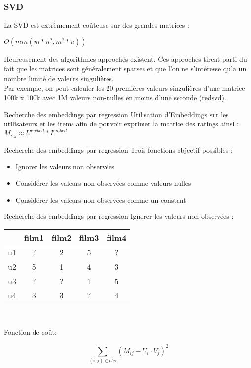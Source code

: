 \begin{frame}
  \frametitle{SVD}
  La SVD est extrèmement coûteuse sur des grandes matrices :
  \begin{center}
    $O(min(m*n^2,m^2*n))$
  \end{center}
  Heureusement des algorithmes approchés existent. Ces approches tirent parti du fait que les matrices sont généralement sparses et que l'on ne s'intéresse qu'a un nombre limité de valeurs singulières. \\
  Par exemple, on peut calculer les 20 premières valeurs singulières d'une matrice 100k x 100k avec 1M valeurs non-nulles en moins d'une seconde (redsvd).
\end{frame}

\begin{frame}{Recherche des embeddings par regression}
  Utilisation d'Embeddings sur les utilisateurs et les items afin de pouvoir exprimer la matrice des ratings ainsi : \\
  $M_{i,j} \approx U^{embed}*I^{embed}$   
\end{frame}

\begin{frame}{Recherche des embeddings par regression}
  Trois fonctions objectif possibles :
  \begin{itemize}
    \item Ignorer les valeurs non observées
    \item Considérer les valeurs non observées comme valeurs nulles
    \item Considérer les valeurs non observées comme un constant
  \end{itemize} 
\end{frame}

\begin{frame}{Recherche des embeddings par regression}
  Ignorer les valeurs non observées :
  \begin{center}
    \begin{tabular}{|l|c|c|c|c|}
      \hline
      & film1 & film2 & film3 & film4 \\
      \hline
      u1 & ? & \cellcolor{NavyBlue!30}2 & \cellcolor{NavyBlue!30}5 & ? \\
      \hline
      u2 & \cellcolor{NavyBlue!30}5 & \cellcolor{NavyBlue!30}1 & \cellcolor{NavyBlue!30}4 & \cellcolor{NavyBlue!30}3 \\
      \hline
      u3 & ? & ? & \cellcolor{NavyBlue!30}1 & \cellcolor{NavyBlue!30}5 \\
      \hline
      u4 & \cellcolor{NavyBlue!30}3 & \cellcolor{NavyBlue!30}3 & ? & \cellcolor{NavyBlue!30}4 \\
      \hline
    \end{tabular}\\
  \end{center}

  \alert{Fonction de coût}:

  $$\sum_{(i,j) \in obs}(M_{ij} - U_i\cdot V_j)^2$$
\end{frame}

